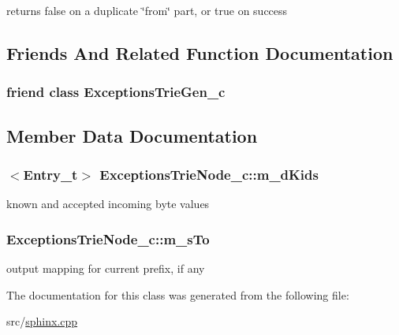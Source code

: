 returns false on a duplicate \char`\"{}from\char`\"{} part, or true on success 



\subsection{Friends And Related Function Documentation}
\hypertarget{classExceptionsTrieNode__c_a824c99a12cb6475c31a4a450c7337e64}{
\subsubsection[{Exceptions\-Trie\-Gen\-\_\-c}]{\setlength{\rightskip}{0pt plus 5cm}friend class {\bf Exceptions\-Trie\-Gen\-\_\-c}\hspace{0.3cm}{\ttfamily [friend]}}}\label{classExceptionsTrieNode__c_a824c99a12cb6475c31a4a450c7337e64}


\subsection{Member Data Documentation}
\hypertarget{classExceptionsTrieNode__c_ac01a27b16e7aa85337570631fecd30c4}{
\subsubsection[{m\-\_\-d\-Kids}]{$<${\bf Entry\-\_\-t}$>$ Exceptions\-Trie\-Node\-\_\-c\-::m\-\_\-d\-Kids\hspace{0.3cm}{\ttfamily [protected]}}}\label{classExceptionsTrieNode__c_ac01a27b16e7aa85337570631fecd30c4}


known and accepted incoming byte values 

\hypertarget{classExceptionsTrieNode__c_a72078664cf6cdc0fbe7bf23f6acb35ea}{
\subsubsection[{m\-\_\-s\-To}]{ Exceptions\-Trie\-Node\-\_\-c\-::m\-\_\-s\-To\hspace{0.3cm}{\ttfamily [protected]}}}\label{classExceptionsTrieNode__c_a72078664cf6cdc0fbe7bf23f6acb35ea}


output mapping for current prefix, if any 



The documentation for this class was generated from the following file\-:\begin{DoxyCompactItemize}
\item 
src/\hyperlink{sphinx_8cpp}{sphinx.\-cpp}\end{DoxyCompactItemize}

